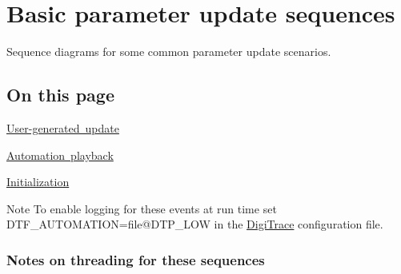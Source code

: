 \hypertarget{a00823}{}\section{Basic parameter update sequences}
\label{a00823}
Sequence diagrams for some common parameter update scenarios. 

\hypertarget{a00823_advancedTopics_parameterUpdates_sequences_contents}{}\subsection{On this page}\label{a00823_advancedTopics_parameterUpdates_sequences_contents}
\begin{DoxyItemize}
\item \mbox{\hyperlink{a00823_parameterUpdates_sequences_user}{User-\/generated update}} \item \mbox{\hyperlink{a00823_parameterUpdates_sequences_automation}{Automation playback}} \item \mbox{\hyperlink{a00823_parameterUpdates_sequences_initialization}{Initialization}}\end{DoxyItemize}
\begin{DoxyNote}{Note}
To enable logging for these events at run time set {\ttfamily D\+T\+F\+\_\+\+A\+U\+T\+O\+M\+A\+T\+I\+ON=file@D\+T\+P\+\_\+\+L\+OW} in the \mbox{\hyperlink{a00834}{Digi\+Trace}} configuration file.
\end{DoxyNote}
\hypertarget{a00823_advancedTopics_parameterUpdates_sequences_notes}{}\subsubsection{Notes on threading for these sequences}\label{a00823_advancedTopics_parameterUpdates_sequences_notes}

